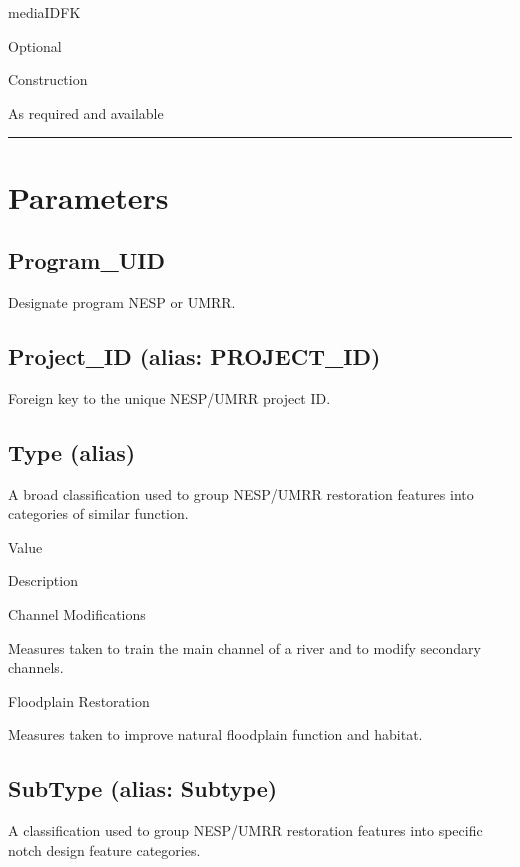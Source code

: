 \documentclass[
  letterpaper,
  DIV=11,
  numbers=noendperiod]{scrreprt}
\begin{document}
mediaIDFK

Optional

Construction

As required and available

\begin{center}\rule{0.5\linewidth}{0.5pt}\end{center}

\section{Parameters}\label{parameters-9}

\subsection{Program\_UID}\label{program_uid-9}

Designate program NESP or UMRR.

\subsection{Project\_ID (alias:
PROJECT\_ID)}\label{project_id-alias-project_id-9}

Foreign key to the unique NESP/UMRR project ID.

\subsection{Type (alias)}\label{type-alias-8}

A broad classification used to group NESP/UMRR restoration features into
categories of similar function.

Value

Description

Channel Modifications

Measures taken to train the main channel of a river and to modify
secondary channels.

Floodplain Restoration

Measures taken to improve natural floodplain function and habitat.

\subsection{SubType (alias: Subtype)}\label{subtype-alias-subtype-9}

A classification used to group NESP/UMRR restoration features into
specific notch design feature categories.
\end{document}
